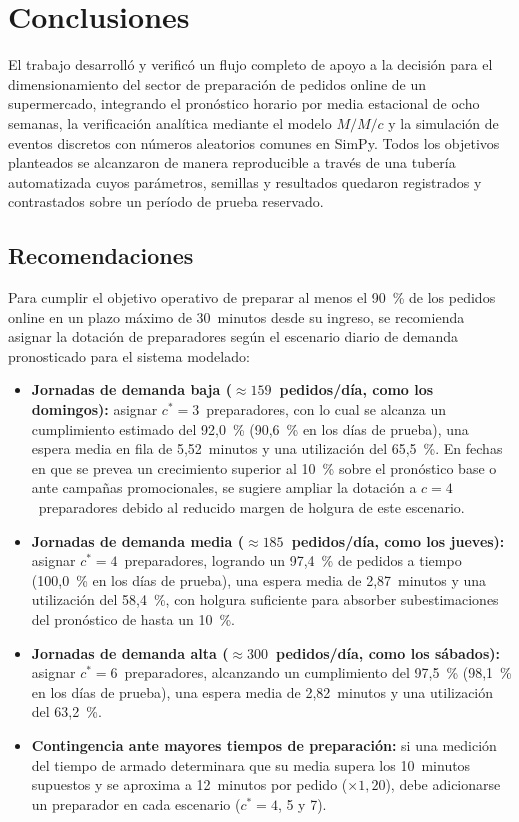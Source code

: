 \section{Conclusiones}
\label{sec:conclusiones}

El trabajo desarrolló y verificó un flujo completo de apoyo a la decisión para el dimensionamiento del sector de preparación de pedidos online de un supermercado, integrando el pronóstico horario por media estacional de ocho semanas, la verificación analítica mediante el modelo $M/M/c$ y la simulación de eventos discretos con números aleatorios comunes en SimPy.
Todos los objetivos planteados se alcanzaron de manera reproducible a través de una tubería automatizada cuyos parámetros, semillas y resultados quedaron registrados y contrastados sobre un período de prueba reservado.

\subsection{Recomendaciones}
\label{sec:recomendaciones}

Para cumplir el objetivo operativo de preparar al menos el 90~\% de los pedidos online en un plazo máximo de 30~minutos desde su ingreso, se recomienda asignar la dotación de preparadores según el escenario diario de demanda pronosticado para el sistema modelado:
\begin{itemize}
  \item \textbf{Jornadas de demanda baja ($\approx 159$~pedidos/día, como los domingos):} asignar $c^* = 3$~preparadores, con lo cual se alcanza un cumplimiento estimado del 92,0~\% (90,6~\% en los días de prueba), una espera media en fila de 5,52~minutos y una utilización del 65,5~\%.
  En fechas en que se prevea un crecimiento superior al 10~\% sobre el pronóstico base o ante campañas promocionales, se sugiere ampliar la dotación a $c = 4$~preparadores debido al reducido margen de holgura de este escenario.
  \item \textbf{Jornadas de demanda media ($\approx 185$~pedidos/día, como los jueves):} asignar $c^* = 4$~preparadores, logrando un 97,4~\% de pedidos a tiempo (100,0~\% en los días de prueba), una espera media de 2,87~minutos y una utilización del 58,4~\%, con holgura suficiente para absorber subestimaciones del pronóstico de hasta un 10~\%.
  \item \textbf{Jornadas de demanda alta ($\approx 300$~pedidos/día, como los sábados):} asignar $c^* = 6$~preparadores, alcanzando un cumplimiento del 97,5~\% (98,1~\% en los días de prueba), una espera media de 2,82~minutos y una utilización del 63,2~\%.
  \item \textbf{Contingencia ante mayores tiempos de preparación:} si una medición del tiempo de armado determinara que su media supera los 10~minutos supuestos y se aproxima a 12~minutos por pedido ($\times 1{,}20$), debe adicionarse un preparador en cada escenario ($c^* = 4$, 5 y 7).
\end{itemize}

